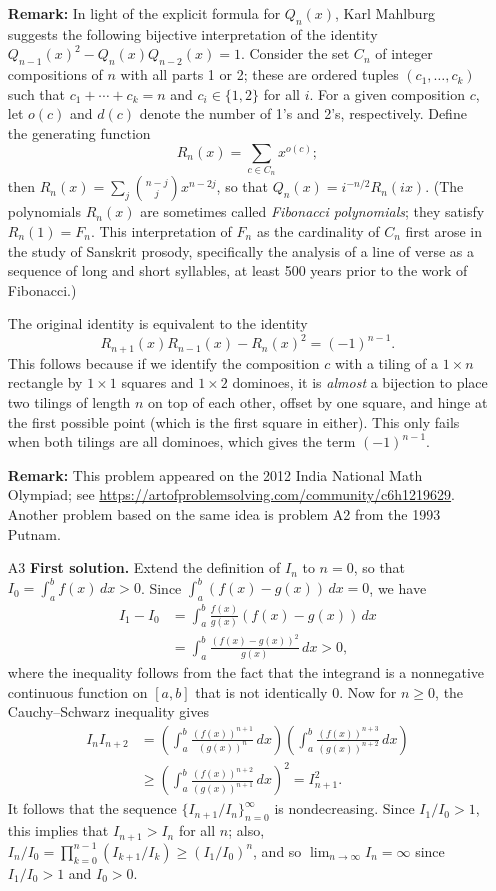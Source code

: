 \documentclass[amssymb,twocolumn,pra,10pt,aps]{revtex4-1}
\begin{document}
\begin{itemize}
\noindent
\textbf{Remark:}
In light of the explicit formula for $Q_n(x)$,
Karl Mahlburg suggests the following bijective interpretation of the identity
$Q_{n-1}(x)^2 - Q_n(x) Q_{n-2}(x) = 1$.
Consider the set $C_n$ of integer compositions of $n$ with all parts 1 or 2; 
these are ordered tuples $(c_1, \dots, c_k)$ such that $c_1 + \cdots + c_k = n$ and $c_i  \in \{1,2\}$ for all $i$.
For a given composition $c$, let $o(c)$ and $d(c)$ denote the number of 1's and 2's, respectively.
Define the generating function
\[
R_n(x) = \sum_{c \in C_n} x^{o(c)};
\]
then $R_n(x) = \sum_{j} \binom{n-j}{j} x^{n-2j}$, so that $Q_n(x) = i^{-n/2} R_n(ix)$.
(The polynomials $R_n(x)$ are sometimes called \emph{Fibonacci polynomials}; they satisfy $R_n(1) = F_n$.
This interpretation of $F_n$ as the cardinality of $C_n$ first arose in the study of Sanskrit prosody, specifically the analysis of a line of verse as a sequence of long and short syllables, at least 500 years prior to
the work of Fibonacci.)

The original identity is equivalent to the identity
\[
R_{n+1}(x) R_{n-1}(x) - R_n(x)^2 = (-1)^{n-1}.
\]
This follows because if we identify the composition $c$ with a tiling of a $1 \times n$ rectangle by $1 \times 1$ squares and $1 \times 2$ dominoes, it is \emph{almost} a bijection to place two tilings of length $n$ on top of each other, offset by one square, and hinge at the first possible point (which is the first square in either). This only fails when both tilings are all dominoes, which gives the term $(-1)^{n-1}$.

\noindent
\textbf{Remark:}
This problem appeared on the 2012 India National Math Olympiad; see
\url{https://artofproblemsolving.com/community/c6h1219629}.
Another problem based on the same idea is problem A2 from the 1993 Putnam.

\item[A3]
\textbf{First solution.}
Extend the definition of $I_n$ to $n=0$, so that $I_0 = \int_a^b f(x)\,dx > 0$. Since $\int_a^b (f(x)-g(x))\,dx = 0$, we have
\begin{align*}
I_1-I_0 &= \int_a^b \frac{f(x)}{g(x)}(f(x)-g(x)) \, dx \\
&= \int_a^b \frac{(f(x)-g(x))^2}{g(x)} \,dx > 0,
\end{align*}
where the inequality follows from the fact that the integrand is a nonnegative continuous function on $[a,b]$ that is not identically $0$. Now for $n \geq 0$, the Cauchy--Schwarz inequality gives
\begin{align*}
I_n I_{n+2} &= \left( \int_a^b \frac{(f(x))^{n+1}}{(g(x))^n}\,dx \right) \left( \int_a^b \frac{(f(x))^{n+3}}{(g(x))^{n+2}}\,dx \right) \\
&\geq \left(\int_a^b \frac{(f(x))^{n+2}}{(g(x))^{n+1}}\,dx \right)^2 = I_{n+1}^2.
\end{align*}
It follows that the sequence $\{I_{n+1}/I_n\}_{n=0}^\infty$ is nondecreasing. Since $I_1/I_0>1$, this implies that $I_{n+1}>I_n$ for all $n$; also,
$I_n/I_0 = \prod_{k=0}^{n-1} (I_{k+1}/I_k) \geq (I_1/I_0)^n$, and so $\lim_{n\to\infty} I_n = \infty$ since $I_1/I_0>1$ and $I_0 > 0$.


\end{itemize}
\end{document}
